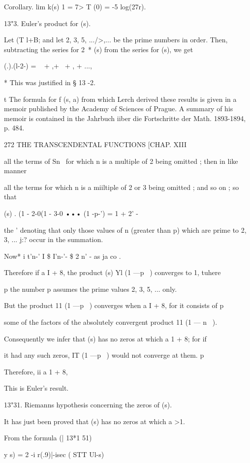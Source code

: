 Corollary. lim k(s) 1 = 7> T (0) = -5 log(27r).

13"3. Euler's product for (s).

Let (T l+B; and let 2, 3, 5, .../>,... be the prime numbers in order.
Then, subtracting the series for 2~* (s) from the series for (s), we
get

 (.).(l-2-) = ~ + ,+~ + , + ...,

* This was justified in § 13 -2.

t The formula for f (s, a) from which Lerch derived these results is
given in a memoir published by the Academy of Sciences of Prague. A
summary of his memoir is contained in the Jahrbuch iiber die
Fortschritte der Math. 1893-1894, p. 484.



272 THE TRANSCENDENTAL FUNCTIONS [CHAP. XIII

all the terms of Sn~ for which n is a multiple of 2 being omitted ;
then in like manner

all the terms for which n is a miiltiple of 2 or 3 being omitted ; and
so on ; so that

 (s) . (1 - 2-0(1 - 3-0 ••• (1 -p-') = 1 + 2' -

the ' denoting that only those values of n (greater than p) which are
prime to 2, 3, ... j:? occur in the summation.

Now* i t'n-' I \$ I'n-'- \$ 2 n' - as ja co .

Therefore if a I + 8, the product (s) Yl (1 —p~ ) converges to 1,
tuhere

p the number p assumes the prime values 2, 3, 5, ... only.

But the product 11 (1 —p~ ) converges when a I + 8, for it consists of
p

some of the factors of the absolutely convergent product 11 (1 — n~ ).

Consequently we infer that (s) has no zeros at which a 1 + 8; for if

it had any such zeros, IT (1 —p~ ) would not converge at them. p

Therefore, ii a 1 + 8,

This is Euler's result.

13"31. Riemanns hypothesis concerning the zeros of (s).

It has just been proved that (s) has no zeros at which a >1.

From the formula (| 13*1 51)

y s) = 2 -i r(.9)|-isec ( STT Ul-s)

